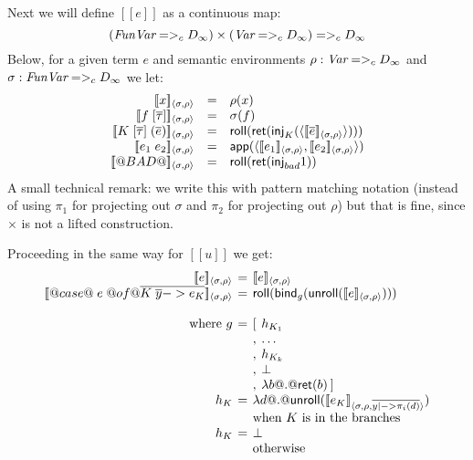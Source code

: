 \documentclass[preprint,nocopyrightspace]{sigplanconf}
\begin{document}
Next we will define $[\![e]\!]$ as a continuous map: 
\[ 
    (\textit{FunVar} =>_c D_{\infty}) \times (\textit{Var} =>_c D_{\infty}) =>_c D_{\infty}
\] 
Below, for a given term $e$ and semantic environments $\rho : \textit{Var} =>_c D_{\infty}$ and 
$\sigma : \textit{FunVar} =>_c D_{\infty}$ we let: 
\[\begin{array}{rcll}
  \interp{x}{\sigma}{\rho} & = & \rho(x) \\ 
  \interp{f\;[\taus]}{\sigma}{\rho} & = & \sigma(f) \\
  \interp{K\;[\taus]\;(\ol{e})}{\sigma}{\rho} & = & \roll(\ret(\inj{K}(\langle\interp{\ol{e}}{\sigma}{\rho}\rangle))) \\ 
  \interp{e_1\;e_2}{\sigma}{\rho} & = & \dapp(\langle \interp{e_1}{\sigma}{\rho}, \interp{e_2}{\sigma}{\rho}\rangle) \\ 
  \interp{@BAD@}{\sigma}{\rho} & = & \roll(\ret(\inj{bad}1))
\end{array}\]
A small technical remark: we write this with pattern matching notation (instead of using $\pi_1$ for projecting 
out $\sigma$ and $\pi_2$ for projecting out $\rho$) but that is fine, since $\times$ is not a lifted construction. 

Proceeding in the same way for $[\![u]\!]$ we get:
\[\setlength{\arraycolsep}{2pt}
  \begin{array}{rcll}
  \interp{e}{\sigma}{\rho} & = & \multicolumn{2}{l}{\interp{e}{\sigma}{\rho}} \\ 
  \interp{@case@\;e\;@of@ \ol{ K\;\ys -> e_K}}{\sigma}{\rho} & = & \multicolumn{2}{l}{\roll(\bind_{g} (\unroll(\interp{e}{\sigma}{\rho})))} \\ \\ 
  \text{ where } g  & = & [ & h_{K_1} \\
                    &   & , & \ldots \\
                    &   & , & h_{K_k} \\
                    &   & , & \bot \\ 
                    &   & , & \dlambda b @.@ \ret(b) \hspace{2pt} ] \\ 
              h_{K} & =  & \multicolumn{2}{l}{\dlambda d @.@ \unroll(\interp{e_K}{\sigma}{\rho, \ol{y |-> \pi_i(d)}})} \\ 
                    &   & \multicolumn{2}{l}{\text{when } K \text{ is in the branches}} \\
              h_{K}  & = & \multicolumn{2}{l}{\bot } \\ 
                    &   & \multicolumn{2}{l}{\text{otherwise}}                  
\end{array}\]
\end{document}
